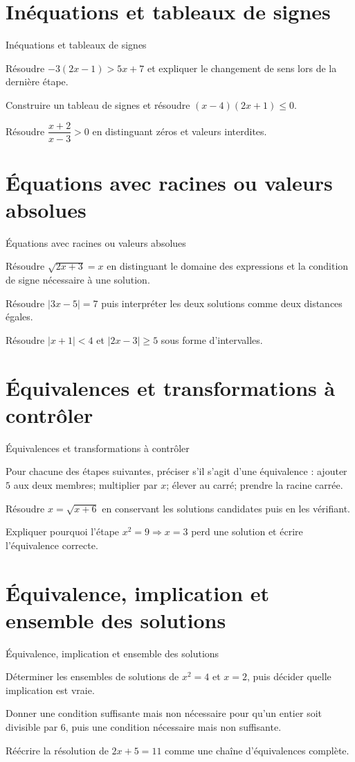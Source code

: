 \section{Inéquations et tableaux de signes}
\label{workbook:section:02.04}
\begin{exerciseblock}{Inéquations et tableaux de signes}
\item Résoudre $-3(2x-1)>5x+7$ et expliquer le changement de sens lors de la dernière étape.
\item Construire un tableau de signes et résoudre $(x-4)(2x+1)\le0$.
\item Résoudre $\dfrac{x+2}{x-3}>0$ en distinguant zéros et valeurs interdites.
\end{exerciseblock}
\section{Équations avec racines ou valeurs absolues}
\label{workbook:section:02.05}
\begin{exerciseblock}{Équations avec racines ou valeurs absolues}
\item Résoudre $\sqrt{2x+3}=x$ en distinguant le domaine des expressions et la condition de signe nécessaire à une solution.
\item Résoudre $|3x-5|=7$ puis interpréter les deux solutions comme deux distances égales.
\item Résoudre $|x+1|<4$ et $|2x-3|\ge5$ sous forme d'intervalles.
\end{exerciseblock}
\section{Équivalences et transformations à contrôler}
\label{workbook:section:02.06}
\begin{exerciseblock}{Équivalences et transformations à contrôler}
\item Pour chacune des étapes suivantes, préciser s'il s'agit d'une équivalence : ajouter $5$ aux deux membres; multiplier par $x$; élever au carré; prendre la racine carrée.
\item Résoudre $x=\sqrt{x+6}$ en conservant les solutions candidates puis en les vérifiant.
\item Expliquer pourquoi l'étape $x^2=9\Rightarrow x=3$ perd une solution et écrire l'équivalence correcte.
\end{exerciseblock}
\section{Équivalence, implication et ensemble des solutions}
\label{workbook:section:02.07}
\begin{exerciseblock}{Équivalence, implication et ensemble des solutions}
\item Déterminer les ensembles de solutions de $x^2=4$ et $x=2$, puis décider quelle implication est vraie.
\item Donner une condition suffisante mais non nécessaire pour qu'un entier soit divisible par $6$, puis une condition nécessaire mais non suffisante.
\item Réécrire la résolution de $2x+5=11$ comme une chaîne d'équivalences complète.
\end{exerciseblock}
